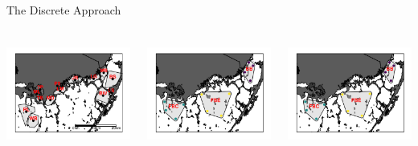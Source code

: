\documentclass[compress,noflama,nosectionpages]{beamer}
\begin{document}
\begin{frame}{The Discrete Approach}
	\begin{columns}
		\begin{column}[t]{4cm}
			\includegraphics[height=3.5cm,clip=true,trim = 0mm 0mm 0mm 0mm,keepaspectratio=true]{figures/fbmap_dflow.png}%
		\end{column}
		
		\begin{column}[c]{4cm}
			\includegraphics[height=3.5cm,clip=true,trim = 0mm 0mm 0mm 0mm,keepaspectratio=true]{figures/fbmap_wqmn.png}%
		\end{column}
		
		\begin{column}[b]{4cm}
			\includegraphics[height=3.5cm,clip=true,trim = 0mm 0mm 0mm 0mm,keepaspectratio=true]{figures/fbmap_wqmn.png}%
		\end{column}
	\end{columns}
\end{frame}
\end{document}
